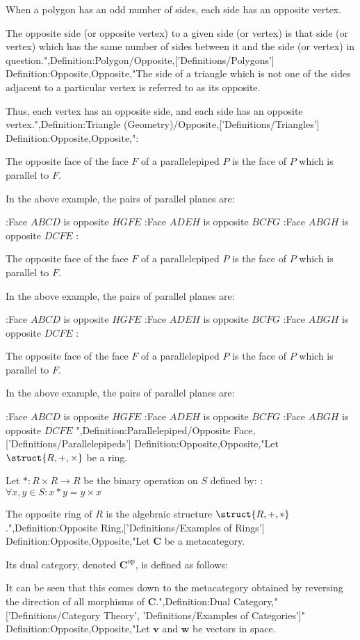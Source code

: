 When a polygon has an odd number of sides, each side has an opposite vertex.


The opposite side (or opposite vertex) to a given side (or vertex) is that side (or vertex) which has the same number of sides between it and the side (or vertex) in question.",Definition:Polygon/Opposite,['Definitions/Polygons']
Definition:Opposite,Opposite,"The side of a triangle which is not one of the sides adjacent to a particular vertex is referred to as its opposite.

Thus, each vertex has an opposite side, and each side has an opposite vertex.",Definition:Triangle (Geometry)/Opposite,['Definitions/Triangles']
Definition:Opposite,Opposite,":

The opposite face of the face $F$ of a parallelepiped $P$ is the face of $P$ which is parallel to $F$.

In the above example, the pairs of parallel planes are:

:Face $ABCD$ is opposite $HGFE$
:Face $ADEH$ is opposite $BCFG$
:Face $ABGH$ is opposite $DCFE$
:

The opposite face of the face $F$ of a parallelepiped $P$ is the face of $P$ which is parallel to $F$.

In the above example, the pairs of parallel planes are:

:Face $ABCD$ is opposite $HGFE$
:Face $ADEH$ is opposite $BCFG$
:Face $ABGH$ is opposite $DCFE$
:

The opposite face of the face $F$ of a parallelepiped $P$ is the face of $P$ which is parallel to $F$.

In the above example, the pairs of parallel planes are:

:Face $ABCD$ is opposite $HGFE$
:Face $ADEH$ is opposite $BCFG$
:Face $ABGH$ is opposite $DCFE$
",Definition:Parallelepiped/Opposite Face,['Definitions/Parallelepipeds']
Definition:Opposite,Opposite,"Let $\struct {R, +, \times}$ be a ring.


Let $* : R \times R \to R$ be the binary operation on $S$ defined by:
:$\forall x, y \in S: x * y = y \times x$

The opposite ring of $R$ is the algebraic structure $\struct {R, +, *}$.",Definition:Opposite Ring,['Definitions/Examples of Rings']
Definition:Opposite,Opposite,"Let $\mathbf C$ be a metacategory.


Its dual category, denoted $\mathbf C^{\text{op} }$, is defined as follows:



It can be seen that this comes down to the metacategory obtained by reversing the direction of all morphisms of $\mathbf C$.",Definition:Dual Category,"['Definitions/Category Theory', 'Definitions/Examples of Categories']"
Definition:Opposite,Opposite,"Let $\mathbf v$ and $\mathbf w$ be vectors in space.

